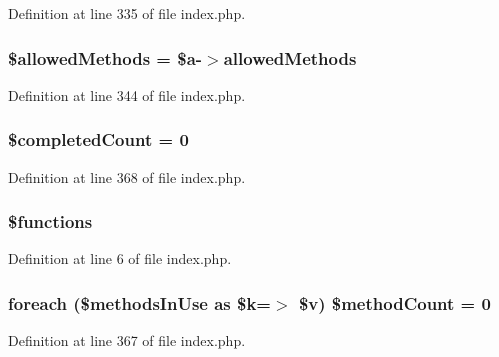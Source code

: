 Definition at line 335 of file index.\-php.

\hypertarget{index_8php_ab278eba7cab5341dacdccecd7a2cc2df}{
\subsubsection[{\$allowed\-Methods}]{\setlength{\rightskip}{0pt plus 5cm}\$allowed\-Methods = \$a-\/$>$allowed\-Methods}}\label{index_8php_ab278eba7cab5341dacdccecd7a2cc2df}


Definition at line 344 of file index.\-php.

\hypertarget{index_8php_a51c734a41c7747051953ec3d78dd1c5b}{
\subsubsection[{\$completed\-Count}]{\setlength{\rightskip}{0pt plus 5cm}\$completed\-Count = 0}}\label{index_8php_a51c734a41c7747051953ec3d78dd1c5b}


Definition at line 368 of file index.\-php.

\hypertarget{index_8php_aa75daea491817f3b64daa2f51128bcdf}{
\subsubsection[{\$functions}]{\setlength{\rightskip}{0pt plus 5cm}\$functions}}\label{index_8php_aa75daea491817f3b64daa2f51128bcdf}


Definition at line 6 of file index.\-php.

\hypertarget{index_8php_a56c1b7384519355df73a254a12f0bae3}{
\subsubsection[{\$method\-Count}]{\setlength{\rightskip}{0pt plus 5cm}foreach (\$methods\-In\-Use as \$k=$>$ \$v) \$method\-Count = 0}}\label{index_8php_a56c1b7384519355df73a254a12f0bae3}


Definition at line 367 of file index.\-php.

